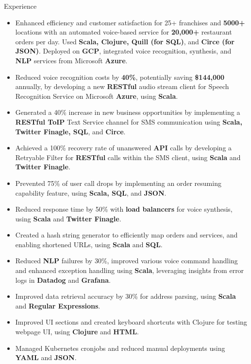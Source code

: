 \documentclass{resume} %
\begin{document}
\begin{workSection}{Experience}
      \experienceItem[
      company=Novo Labs Inc,
      location=Dallas{,} TX,
      position=Software Engineer,
      duration=Feb. 2021 – Jun. 2023
      ]
      \vspace{-0.65em}
      \begin{itemize}
            \itemsep -6pt {}
            \item Enhanced efficiency and customer satisfaction for 25+ franchises and \textbf{5000+} locations with an automated voice-based service for \textbf{20,000+} restaurant orders per day. Used \textbf{Scala, Clojure, Quill (for SQL)}, and \textbf{Circe (for JSON)}. Deployed on \textbf{GCP}, integrated voice recognition, synthesis, and \textbf{NLP} services from Microsoft \textbf{Azure}.
            \item Reduced voice recognition costs by \textbf{40\%}, potentially saving \textbf{\$144,000} annually, by developing a new \textbf{RESTful} audio stream client for Speech Recognition Service on Microsoft \textbf{Azure}, using \textbf{Scala}.
            \item Generated a 40\% increase in new business opportunities by implementing a \textbf{RESTful ToIP} Text Service channel for SMS communication using \textbf{Scala, Twitter Finagle, SQL}, and \textbf{Circe}.
            \item Achieved a 100\% recovery rate of unanswered \textbf{API} calls by developing a Retryable Filter for \textbf{RESTful} calls within the SMS client, using \textbf{Scala} and \textbf{Twitter Finagle}.
            \item Prevented 75\% of user call drops by implementing an order resuming capability feature, using \textbf{Scala, SQL}, and \textbf{JSON}.
            \item Reduced response time by 50\% with \textbf{load balancers} for voice synthesis, using \textbf{Scala} and \textbf{Twitter Finagle}.
            \item Created a hash string generator to efficiently map orders and services, and enabling shortened URLs, using \textbf{Scala} and \textbf{SQL}.
            \item Reduced \textbf{NLP} failures by 30\%, improved various voice command handling and enhanced exception handling using \textbf{Scala}, leveraging insights from error logs in \textbf{Datadog} and \textbf{Grafana}.
            \item Improved data retrieval accuracy by 30\% for address parsing, using \textbf{Scala} and \textbf{Regular Expressions}.
            \item Improved UI sections and created keyboard shortcuts with Clojure for testing webpage UI, using \textbf{Clojure} and \textbf{HTML}.
            \item Managed Kubernetes cronjobs and reduced manual deployments using \textbf{YAML} and \textbf{JSON}.
      \end{itemize}


\end{workSection}
\end{document}
